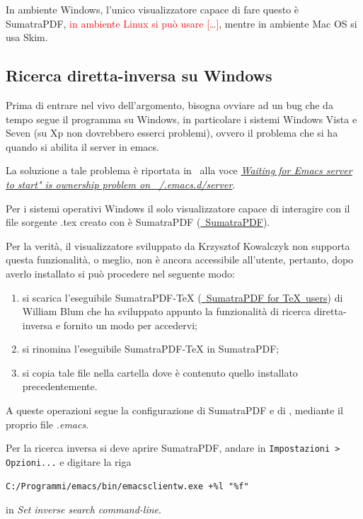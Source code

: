 \documentclass[10pt,a4paper]{article}
\begin{document}
In ambiente  Windows, l'unico visualizzatore  capace di fare  questo è
SumatraPDF, \textcolor{red}{in  ambiente Linux si può  usare [\ldots]},
mentre in ambiente Mac OS si usa Skim.

\subsection*{Ricerca diretta-inversa su Windows}
\label{sec:fiswin}
Prima di entrare nel vivo dell'argomento, bisogna ovviare ad un bug che
da tempo segue il programma \emacs{} su Windows, in particolare i
sistemi Windows Vista e Seven (su Xp non dovrebbero esserci problemi),
ovvero il problema che si ha quando si abilita il server 
in emacs. %

La soluzione a tale problema è riportata in~\parencite{emacsW32:wiki}
alla voce \href{http://www.emacswiki.org/emacs/EmacsW32#toc49}{\emph{Waiting for Emacs server to start" is ownership problem on ~/.emacs.d/server}}.

Per i sistemi operativi Windows il solo visualizzatore capace di
interagire con il file sorgente \textsf{.tex} creato con \emacs{} è
\textsf{SumatraPDF} (\href{http://blog.kowalczyk.info/software/sumatrapdf/free-pdf-reader.html}{\mano{}~SumatraPDF}).

Per la verità, il visualizzatore sviluppato da Krzysztof Kowalczyk non
supporta questa funzionalità, o meglio, non è ancora accessibile
all'utente, pertanto, dopo averlo installato si può
procedere nel seguente modo:
\begin{enumerate}
\item si scarica l'eseguibile \textsf{SumatraPDF-TeX}
  (\href{http://william.famille-blum.org/software/sumatra/}{\mano{}~SumatraPDF
    for \TeX\ users}) di William Blum
  che ha sviluppato appunto la funzionalità di ricerca diretta-inversa
  e fornito un modo per accedervi;
\item si rinomina l'eseguibile SumatraPDF-TeX in SumatraPDF;
\item si copia tale file nella cartella dove è contenuto quello
  installato precedentemente.
\end{enumerate}

A queste operazioni segue la configurazione di \textsf{SumatraPDF} e di \emacs,
mediante il proprio file \emph{.emacs}.

Per la ricerca inversa si deve aprire SumatraPDF, andare in
\texttt{Impostazioni > Opzioni...} e digitare la riga
\begin{Verbatim}
C:/Programmi/emacs/bin/emacsclientw.exe +%l "%f"
\end{Verbatim}
in \emph{Set inverse search command-line}.
\end{document}
